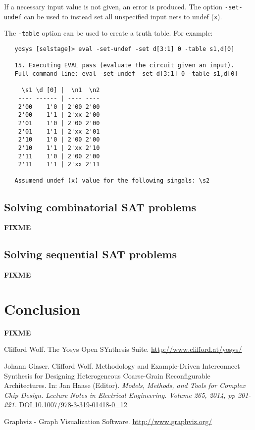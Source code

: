 \documentclass[9pt,technote,a4paper]{IEEEtran}
\def\FIXME{{\color{red}\bf FIXME}}
\begin{document}
If a necessary input value is not given, an error is produced. The option
{\tt -set-undef} can be used to instead set all unspecified input nets to
undef ({\tt x}).

The {\tt -table} option can be used to create a truth table. For example:

{\scriptsize
\begin{verbatim}
   yosys [selstage]> eval -set-undef -set d[3:1] 0 -table s1,d[0]
   
   15. Executing EVAL pass (evaluate the circuit given an input).
   Full command line: eval -set-undef -set d[3:1] 0 -table s1,d[0]
   
     \s1 \d [0] |  \n1  \n2
    ---- ------ | ---- ----
    2'00    1'0 | 2'00 2'00
    2'00    1'1 | 2'xx 2'00
    2'01    1'0 | 2'00 2'00
    2'01    1'1 | 2'xx 2'01
    2'10    1'0 | 2'00 2'00
    2'10    1'1 | 2'xx 2'10
    2'11    1'0 | 2'00 2'00
    2'11    1'1 | 2'xx 2'11
   
   Assumend undef (x) value for the following singals: \s2
\end{verbatim}
}

\subsection{Solving combinatorial SAT problems}

\FIXME

\subsection{Solving sequential SAT problems}

\FIXME

\section{Conclusion}
\label{conclusion}

\FIXME

\begin{thebibliography}{9}

Clifford Wolf. The Yosys Open SYnthesis Suite.
\url{http://www.clifford.at/yosys/}

Johann Glaser. Clifford Wolf. Methodology and Example-Driven Interconnect
Synthesis for Designing Heterogeneous Coarse-Grain Reconfigurable
Architectures. In: Jan Haase (Editor). {\it Models, Methods, and Tools for Complex Chip Design.
Lecture Notes in Electrical Engineering. Volume 265, 2014, pp 201-221.\/}
\href{http://dx.doi.org/10.1007/978-3-319-01418-0_12}{DOI 10.1007/978-3-319-01418-0\_12}

Graphviz - Graph Visualization Software.
\url{http://www.graphviz.org/}

\end{thebibliography}
\end{document}

